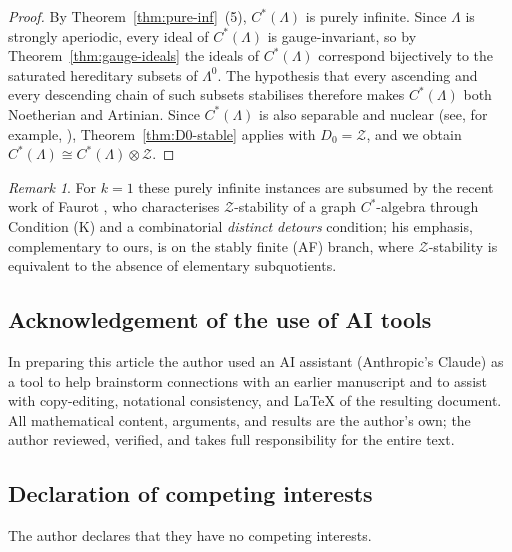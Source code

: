 \documentclass[12pt]{amsart}
\theoremstyle{plain}
\theoremstyle{definition}
\theoremstyle{remark}
\newtheorem{remark}[theorem]{Remark}
\begin{document}
\begin{proof}
By Theorem~\ref{thm:pure-inf}~(5), $C^*(\Lambda)$ is purely infinite.
Since $\Lambda$ is strongly aperiodic, every ideal of $C^*(\Lambda)$ is
gauge-invariant, so by Theorem~\ref{thm:gauge-ideals} the ideals of
$C^*(\Lambda)$ correspond bijectively to the saturated hereditary subsets of
$\Lambda^0$. The hypothesis that every ascending and every descending chain of
such subsets stabilises therefore makes $C^*(\Lambda)$ both Noetherian and
Artinian.
Since $C^*(\Lambda)$ is also separable and nuclear (see, for example, \cite{KP2,S}), 
Theorem~\ref{thm:D0-stable} applies with $D_0 = \mathcal{Z}$, and we obtain 
$C^*(\Lambda) \cong C^*(\Lambda) \otimes \mathcal{Z}$.
\end{proof}

\begin{remark}
For $k=1$ these purely infinite instances are subsumed by the recent work of
Faurot \cite{Fau}, who characterises $\mathcal Z$-stability of a graph
$C^*$-algebra through Condition (K) and a combinatorial \emph{distinct
detours} condition; his emphasis, complementary to ours, is on the stably
finite (AF) branch, where $\mathcal Z$-stability is equivalent to the absence
of elementary subquotients.
\end{remark}


\subsection*{Acknowledgement of the use of AI tools}
In preparing this article the author used an AI assistant (Anthropic's Claude)
as a tool to help brainstorm connections with an earlier manuscript and to
assist with copy-editing, notational consistency, and \LaTeX{} of the resulting
document. All mathematical content, arguments, and results are the author's own;
the author reviewed, verified, and takes full responsibility for the entire text.


\subsection*{Declaration of competing interests}
The author declares that they have no competing interests.


\end{document}
